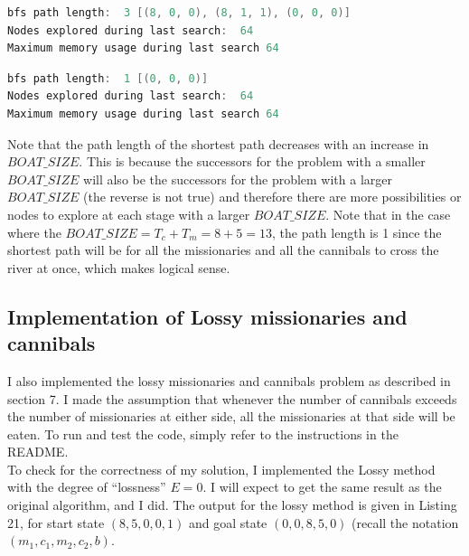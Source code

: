 \documentclass[9.5pt]{extarticle}
\begin{document}
\begin{lstlisting}[language=java,caption={BFS for start state of (8,5,1) and BOAT\_SIZE = 9}]
bfs path length:  3 [(8, 0, 0), (8, 1, 1), (0, 0, 0)]
Nodes explored during last search:  64
Maximum memory usage during last search 64
\end{lstlisting}

\begin{lstlisting}[language=java,caption={BFS for start state of (8,5,1) and BOAT\_SIZE = 13}]
bfs path length:  1 [(0, 0, 0)]
Nodes explored during last search:  64
Maximum memory usage during last search 64
\end{lstlisting}

Note that the path length of the shortest path decreases with an increase in $BOAT\_SIZE$. This is because the successors for the problem with a smaller $BOAT\_SIZE$ will also be the successors for the problem with a larger $BOAT\_SIZE$ (the reverse is not true) and therefore there are more possibilities or nodes to explore at each stage with a larger $BOAT\_SIZE$. Note that in the case where the $BOAT\_SIZE = T_c + T_m = 8 + 5 =13$, the path length is 1 since the shortest path will be for all the missionaries and all the cannibals to cross the river at once, which makes logical sense.

\subsection{Implementation of Lossy missionaries and cannibals}

I also implemented the lossy missionaries and cannibals problem as described in section 7. I made the assumption that whenever the number of cannibals exceeds the number of missionaries at either side, all the missionaries at that side will be eaten. To run and test the code, simply refer to the instructions in the README.\\

To check for the correctness of my solution, I implemented the Lossy method with the degree of ``lossness'' $E = 0$. I will expect to get the same result as the original algorithm, and I did. The output for the lossy method is given in Listing 21, for start state $(8,5,0,0,1)$ and goal state $(0,0,8,5,0)$ (recall the notation $(m_1,c_1,m_2,c_2,b)$. \\
\end{document}
